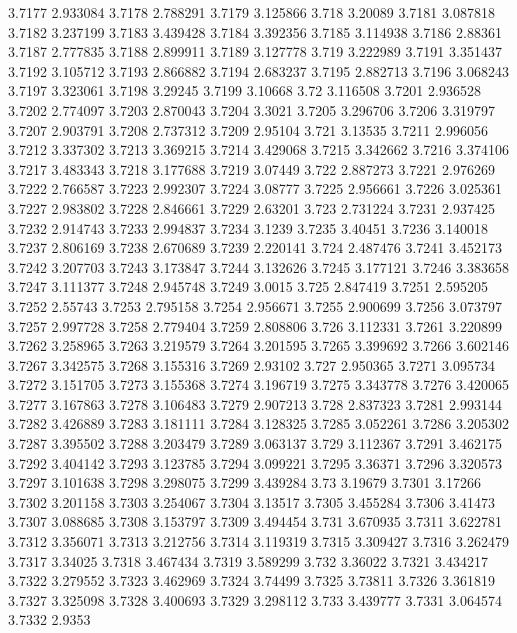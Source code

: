 3.7177  2.933084
3.7178  2.788291
3.7179  3.125866
3.718  3.20089
3.7181  3.087818
3.7182  3.237199
3.7183  3.439428
3.7184  3.392356
3.7185  3.114938
3.7186  2.88361
3.7187  2.777835
3.7188  2.899911
3.7189  3.127778
3.719  3.222989
3.7191  3.351437
3.7192  3.105712
3.7193  2.866882
3.7194  2.683237
3.7195  2.882713
3.7196  3.068243
3.7197  3.323061
3.7198  3.29245
3.7199  3.10668
3.72  3.116508
3.7201  2.936528
3.7202  2.774097
3.7203  2.870043
3.7204  3.3021
3.7205  3.296706
3.7206  3.319797
3.7207  2.903791
3.7208  2.737312
3.7209  2.95104
3.721  3.13535
3.7211  2.996056
3.7212  3.337302
3.7213  3.369215
3.7214  3.429068
3.7215  3.342662
3.7216  3.374106
3.7217  3.483343
3.7218  3.177688
3.7219  3.07449
3.722  2.887273
3.7221  2.976269
3.7222  2.766587
3.7223  2.992307
3.7224  3.08777
3.7225  2.956661
3.7226  3.025361
3.7227  2.983802
3.7228  2.846661
3.7229  2.63201
3.723  2.731224
3.7231  2.937425
3.7232  2.914743
3.7233  2.994837
3.7234  3.1239
3.7235  3.40451
3.7236  3.140018
3.7237  2.806169
3.7238  2.670689
3.7239  2.220141
3.724  2.487476
3.7241  3.452173
3.7242  3.207703
3.7243  3.173847
3.7244  3.132626
3.7245  3.177121
3.7246  3.383658
3.7247  3.111377
3.7248  2.945748
3.7249  3.0015
3.725  2.847419
3.7251  2.595205
3.7252  2.55743
3.7253  2.795158
3.7254  2.956671
3.7255  2.900699
3.7256  3.073797
3.7257  2.997728
3.7258  2.779404
3.7259  2.808806
3.726  3.112331
3.7261  3.220899
3.7262  3.258965
3.7263  3.219579
3.7264  3.201595
3.7265  3.399692
3.7266  3.602146
3.7267  3.342575
3.7268  3.155316
3.7269  2.93102
3.727  2.950365
3.7271  3.095734
3.7272  3.151705
3.7273  3.155368
3.7274  3.196719
3.7275  3.343778
3.7276  3.420065
3.7277  3.167863
3.7278  3.106483
3.7279  2.907213
3.728  2.837323
3.7281  2.993144
3.7282  3.426889
3.7283  3.181111
3.7284  3.128325
3.7285  3.052261
3.7286  3.205302
3.7287  3.395502
3.7288  3.203479
3.7289  3.063137
3.729  3.112367
3.7291  3.462175
3.7292  3.404142
3.7293  3.123785
3.7294  3.099221
3.7295  3.36371
3.7296  3.320573
3.7297  3.101638
3.7298  3.298075
3.7299  3.439284
3.73  3.19679
3.7301  3.17266
3.7302  3.201158
3.7303  3.254067
3.7304  3.13517
3.7305  3.455284
3.7306  3.41473
3.7307  3.088685
3.7308  3.153797
3.7309  3.494454
3.731  3.670935
3.7311  3.622781
3.7312  3.356071
3.7313  3.212756
3.7314  3.119319
3.7315  3.309427
3.7316  3.262479
3.7317  3.34025
3.7318  3.467434
3.7319  3.589299
3.732  3.36022
3.7321  3.434217
3.7322  3.279552
3.7323  3.462969
3.7324  3.74499
3.7325  3.73811
3.7326  3.361819
3.7327  3.325098
3.7328  3.400693
3.7329  3.298112
3.733  3.439777
3.7331  3.064574
3.7332  2.9353
